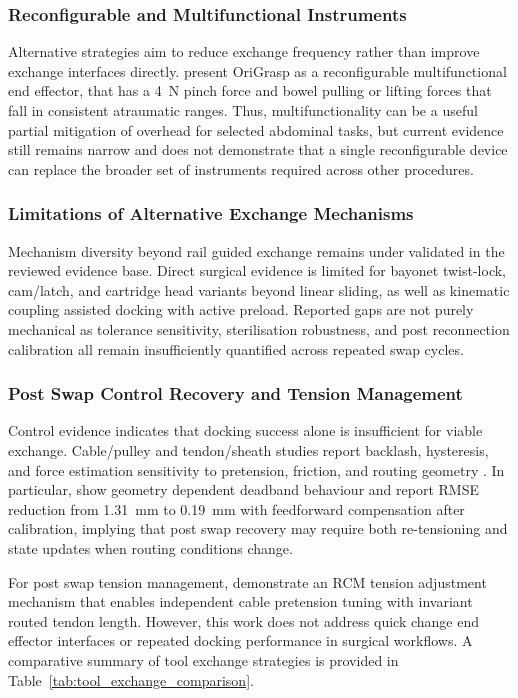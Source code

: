\documentclass[12pt]{article}
\begin{document}
\subsubsection{Reconfigurable and Multifunctional Instruments}
Alternative strategies aim to reduce exchange frequency rather than improve
exchange interfaces directly. \textcite{mocellin2026origrasp} present OriGrasp as
a reconfigurable multifunctional end effector, that has a 4~N pinch force and bowel
pulling or lifting forces that fall in consistent atraumatic ranges. Thus,
multifunctionality can be a useful partial mitigation of overhead for selected abdominal tasks, but current evidence still remains narrow
 and does not demonstrate that a
single reconfigurable device can replace the broader set of instruments required
across other procedures.

\subsubsection{Limitations of Alternative Exchange Mechanisms}
Mechanism diversity beyond rail guided exchange remains under validated in the
reviewed evidence base. Direct surgical evidence is limited for bayonet
twist-lock, cam/latch, and cartridge head variants beyond linear sliding, as
well as kinematic coupling assisted docking with active preload. Reported gaps
are not purely mechanical as tolerance sensitivity, sterilisation robustness,
and post reconnection calibration all
remain insufficiently quantified across repeated swap cycles.

\subsubsection{Post Swap Control Recovery and Tension Management}

Control evidence indicates that docking success alone is insufficient for
viable exchange. Cable/pulley and tendon/sheath studies report
backlash, hysteresis, and force estimation sensitivity to pretension, friction,
and routing geometry \parencite{zou2022transmission, hong2025backlash}. In
particular, \textcite{hong2025backlash} show geometry dependent deadband
behaviour and report RMSE reduction from 1.31~mm to 0.19~mm with feedforward
compensation after calibration, implying that post swap recovery may require
both re-tensioning and state updates when routing
conditions change.

For post swap tension management, \textcite{singh2022tension}
demonstrate an RCM tension adjustment mechanism
that enables independent cable pretension tuning with invariant routed tendon
length. However, this work does not address quick change
end effector interfaces or repeated docking performance in surgical
workflows. A comparative summary of tool exchange strategies is provided in
Table~\ref{tab:tool_exchange_comparison}.
\end{document}
